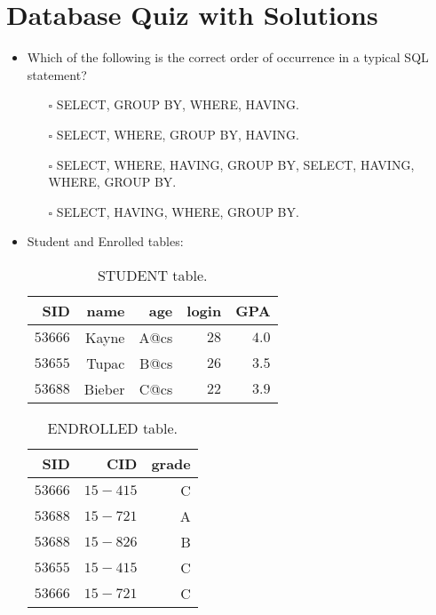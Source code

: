 \documentclass[10pt]{article}
\newcommand{\lightrule}{%
	\arrayrulecolor{black!30}%
	\midrule[\lightrulewidth]%
	\arrayrulecolor{black}}
\begin{document}
	\section{Database Quiz with Solutions}
		\begin{itemize}
			\item Which of the following is the correct order of occurrence in a typical SQL statement?
				\begin{enumerate}
					\item[$\square$] SELECT, GROUP BY, WHERE, HAVING.
					\item[$\square$] SELECT, WHERE, GROUP BY, HAVING.
					\item[$\square$] SELECT, WHERE, HAVING, GROUP BY, SELECT, HAVING, WHERE, GROUP BY.
					\item[$\square$] SELECT, HAVING, WHERE, GROUP BY.
				\end{enumerate}

			\item Student and Enrolled tables:
				\begin{table}[H]
					\centering
					\begin{tabular}{@{} *{5}{r} @{}}
						\toprule
							\textbf{SID} & \textbf{name} & \textbf{age} & \textbf{login} & \textbf{GPA} \\
						\midrule
							$53666$ & Kayne & A@cs & $28$ & $4.0$ \\ 
						\lightrule
							$53655$ & Tupac & B@cs & $26$ & $3.5$ \\  
						\lightrule
							$53688$ & Bieber & C@cs & $22$ & $3.9$ \\ 
						\bottomrule
					\end{tabular}
					\caption{STUDENT table.}
				\end{table}

				\begin{table}[H]
					\centering
					\begin{tabular}{@{} *{3}{r} @{}}
						\toprule
							\textbf{SID} & \textbf{CID} & \textbf{grade} \\
						\midrule
							$53666$ & $15-415$ & C \\ 
						\lightrule
							$53688$ & $15-721$ & A \\  
						\lightrule
							$53688$ & $15-826$ & B \\
						\lightrule 
							$53655$ & $15-415$ & C \\ 
						\lightrule 
							$53666$ & $15-721$ & C \\ 
						\bottomrule
					\end{tabular}
					\caption{ENDROLLED table.}
				\end{table}
			

\end{itemize}
\end{document}
